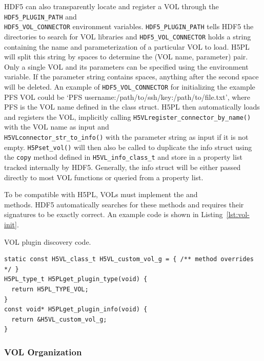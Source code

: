 HDF5 can also transparently locate and register a VOL through the \texttt{HDF5\_PLUGIN\_PATH} and \\ \texttt{HDF5\_VOL\_CONNECTOR} environment variables. \texttt{HDF5\_PLUGIN\_PATH} tells HDF5 the directories to search for VOL libraries and \texttt{HDF5\_VOL\_CONNECTOR} holds a string containing the name and parameterization of a particular VOL to load. H5PL will split this string by spaces to determine the (VOL name, parameter) pair. Only a single VOL and its parameters can be specified using the environment variable. If the parameter string contains spaces, anything after the second space will be deleted. An example of \texttt{HDF5\_VOL\_CONNECTOR} for initializing the example PFS VOL could be `PFS username:/path/to/ssh/key:/path/to/file.txt', where PFS is the VOL name defined in the class struct. H5PL then automatically loads and registers the VOL, implicitly calling \texttt{H5VLregister\_connector\_by\_name()} with the VOL name as input and \\ \texttt{H5VLconnector\_str\_to\_info()} with the parameter string as input if it is not empty. \texttt{H5Pset\_vol()} will then also be called to duplicate the info struct using the \texttt{copy} method defined in \texttt{H5VL\_info\_class\_t} and store in a property list tracked internally by HDF5. Generally, the info struct will be either passed directly to most VOL functions or queried from a property list.

To be compatible with H5PL, VOLs must implement the  and \\  methods. HDF5 automatically searches for these methods and requires their signatures to be exactly correct. An example code is shown in Listing~\ref{lst:vol-init}.

\begin{listing}[!ht]
\centering
\caption{VOL plugin discovery code.}
\label{lst:vol-init}
\begin{verbatim}
static const H5VL_class_t H5VL_custom_vol_g = { /** method overrides */ }
H5PL_type_t H5PLget_plugin_type(void) {
  return H5PL_TYPE_VOL;
}
const void* H5PLget_plugin_info(void) {
  return &H5VL_custom_vol_g;
}
\end{verbatim}
\end{listing}

\subsubsection{VOL Organization}

